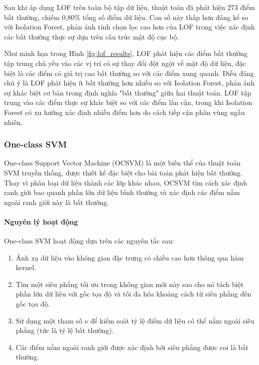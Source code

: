 Sau khi áp dụng LOF trên toàn bộ tập dữ liệu, thuật toán đã phát hiện 273 điểm bất thường, chiếm 0,80\% tổng số điểm dữ liệu. Con số này thấp hơn đáng kể so với Isolation Forest, phản ánh tính chọn lọc cao hơn của LOF trong việc xác định các bất thường thực sự dựa trên cấu trúc mật độ cục bộ.


Như minh họa trong Hình \ref{fig:lof_results}, LOF phát hiện các điểm bất thường tập trung chủ yếu vào các vị trí có sự thay đổi đột ngột về mật độ dữ liệu, đặc biệt là các điểm có giá trị cao bất thường so với các điểm xung quanh. Điều đáng chú ý là LOF phát hiện ít bất thường hơn nhiều so với Isolation Forest, phản ánh sự khác biệt cơ bản trong định nghĩa "bất thường" giữa hai thuật toán. LOF tập trung vào các điểm thực sự khác biệt so với các điểm lân cận, trong khi Isolation Forest có xu hướng xác định nhiều điểm hơn do cách tiếp cận phân vùng ngẫu nhiên.

\subsubsection{One-class SVM}

One-class Support Vector Machine (OCSVM) là một biến thể của thuật toán SVM truyền thống, được thiết kế đặc biệt cho bài toán phát hiện bất thường. Thay vì phân loại dữ liệu thành các lớp khác nhau, OCSVM tìm cách xác định ranh giới bao quanh phần lớn dữ liệu bình thường và xác định các điểm nằm ngoài ranh giới này là bất thường.

\paragraph{Nguyên lý hoạt động}
One-class SVM hoạt động dựa trên các nguyên tắc sau:
\begin{enumerate}
    \item Ánh xạ dữ liệu vào không gian đặc trưng có chiều cao hơn thông qua hàm kernel.
    \item Tìm một siêu phẳng tối ưu trong không gian mới này sao cho nó tách biệt phần lớn dữ liệu với gốc tọa độ và tối đa hóa khoảng cách từ siêu phẳng đến gốc tọa độ.
    \item Sử dụng một tham số $\nu$ để kiểm soát tỷ lệ điểm dữ liệu có thể nằm ngoài siêu phẳng (tức là tỷ lệ bất thường).
    \item Các điểm nằm ngoài ranh giới được xác định bởi siêu phẳng được coi là bất thường.
\end{enumerate}

